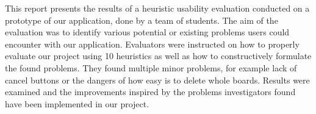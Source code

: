 This report presents the results of a heuristic usability evaluation conducted on a prototype of our application, done by a team of students. The aim of the evaluation was to identify various potential or existing problems users could encounter with our application. Evaluators were instructed on how to properly evaluate our project using 10 heuristics as well as how to constructively formulate the found problems. They found multiple minor problems, for example lack of cancel buttons or the dangers of how easy is to delete whole boards. Results were examined and the improvements inspired by the problems investigators found have been implemented in our project.
